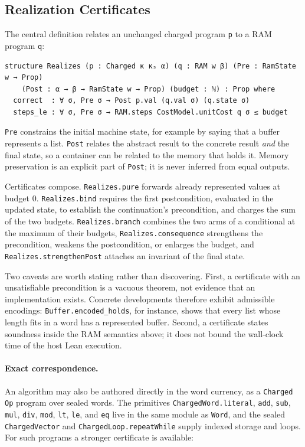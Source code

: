 \documentclass[acmsmall,nonacm]{acmart}
\begin{document}
\subsection{Realization Certificates}\label{sec:realizes}

The central definition relates an unchanged charged program \lstinline{p} to a RAM program \lstinline{q}:

\begin{lstlisting}
structure Realizes (p : Charged κ κₛ α) (q : RAM w β) (Pre : RamState w → Prop)
    (Post : α → β → RamState w → Prop) (budget : ℕ) : Prop where
  correct  : ∀ σ, Pre σ → Post p.val (q.val σ) (q.state σ)
  steps_le : ∀ σ, Pre σ → RAM.steps CostModel.unitCost q σ ≤ budget
\end{lstlisting}

\lstinline{Pre} constrains the initial machine state, for example by saying that a buffer represents a list.
\lstinline{Post} relates the abstract result to the concrete result \emph{and} the final state, so a container can be related to the memory that holds it.
Memory preservation is an explicit part of \lstinline{Post}; it is never inferred from equal outputs.

Certificates compose.
\lstinline{Realizes.pure} forwards already represented values at budget 0.
\lstinline{Realizes.bind} requires the first postcondition, evaluated in the updated state, to establish the continuation's precondition, and charges the sum of the two budgets.
\lstinline{Realizes.branch} combines the two arms of a conditional at the maximum of their budgets, \lstinline{Realizes.consequence} strengthens the precondition, weakens the postcondition, or enlarges the budget, and \lstinline{Realizes.strengthenPost} attaches an invariant of the final state.

Two caveats are worth stating rather than discovering.
First, a certificate with an unsatisfiable precondition is a vacuous theorem, not evidence that an implementation exists.
Concrete developments therefore exhibit admissible encodings: \lstinline{Buffer.encoded_holds}, for instance, shows that every list whose length fits in a word has a represented buffer.
Second, a certificate states soundness inside the RAM semantics above; it does not bound the wall-clock time of the host Lean execution.

\paragraph{Exact correspondence.}
An algorithm may also be authored directly in the word currency, as a \lstinline{Charged Op} program over sealed words.
The primitives \lstinline{ChargedWord.literal}, \lstinline{add}, \lstinline{sub}, \lstinline{mul}, \lstinline{div}, \lstinline{mod}, \lstinline{lt}, \lstinline{le}, and \lstinline{eq} live in the same module as \lstinline{Word}, and the sealed \lstinline{ChargedVector} and \lstinline{ChargedLoop.repeatWhile} supply indexed storage and loops.
For such programs a stronger certificate is available:
\end{document}
